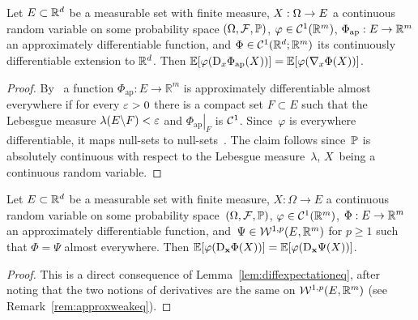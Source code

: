 \begin{lemma}\label{lem:diffexpectationeq}
Let $E\subset \mathbb{R}^d$ be a measurable set with finite measure, $X:\Omega\rightarrow\nobreak E$ a continuous random variable on some probability space $(\Omega, \mathcal{F}, \mathbb{P})$,
$\varphi\in\mathcal{C}^1(\mathbb{R}^m)$, $\Phi_{\mathrm{ap}}: E\rightarrow \mathbb{R}^m$ an approximately differentiable function, and $\Phi\in\mathcal{C}^1(\mathbb{R}^d; \mathbb{R}^m)$
its continuously differentiable extension to $\mathbb{R}^d$.
Then
$\mathbb{E}[\varphi(\mathrm{D}_{x}\Phi_{\mathrm{ap}}(X))] = \mathbb{E}[\varphi(\nabla_x\Phi(X))]$.

\end{lemma}
\begin{proof}
By~\cite[Theorem 3.1.6]{Federer1996GeometricTheory} a function $\Phi_{\mathrm{ap}}: E \rightarrow \mathbb{R}^{m}$ is approximately differentiable almost everywhere if for every $\varepsilon>0$ there is a compact set $F \subset E$ such that the Lebesgue measure $\lambda(E \backslash F)<\varepsilon$ and $\left.\Phi_{\mathrm{ap}}\right|_{F}$ is $\mathcal{C}^{1}$. 
Since~$\varphi$ is everywhere differentiable, 
it maps null-sets to null-sets~\cite[Lemma 7.25]{Rudin1986RealAnalysis}. 
The claim follows since~$\mathbb{P}$ is absolutely continuous with respect to the Lebesgue measure~$\lambda$, $X$~being a continuous random variable.

\end{proof}
\begin{corollary}\label{coro:diffexpectationeq2}
    Let $E\subset \mathbb{R}^d$ be a measurable set with finite measure, ${X:\Omega\rightarrow E}$ a continuous random variable on some probability space~$(\Omega, \mathcal{F}, \mathbb{P})$, $\varphi\in\mathcal{C}^1(\mathbb{R}^m)$, $\Phi:E\rightarrow \mathbb{R}^m$ an approximately differentiable function, and~${\Psi\in\mathcal{W}^{1,p}(E,\mathbb{R}^m)}$
    for $p\geq 1$ such that $\Phi = \Psi$ almost everywhere. Then $\mathbb{E}[\varphi(\mathrm{D}_{\boldsymbol{\mathrm{x}}}\Phi(X))] = \mathbb{E}[\varphi(\mathrm{D}_{\boldsymbol{\mathrm{x}}}\Psi(X))]$.
\end{corollary}
\begin{proof}
This is a direct consequence of Lemma~\ref{lem:diffexpectationeq}, after noting that the two notions of derivatives are the same on $\mathcal{W}^{1,p}(E,\mathbb{R}^m)$ (see Remark~\ref{rem:approxweakeq}).
\end{proof}

